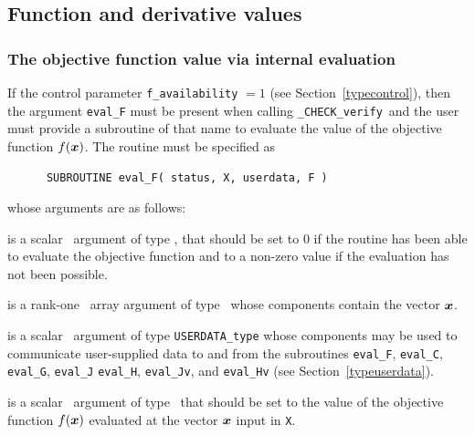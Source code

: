 \documentclass{galahad}
\newcommand{\packagename}{CHECK}
\newcommand{\fullpackagename}{\libraryname\_\packagename}
\newcommand{\solver}{{\tt \fullpackagename\_verify}}
\begin{document}

\subsection{Function and derivative values\label{fdv}}


\subsubsection{The objective function value via internal evaluation\label{ffv}}

If the control parameter {\tt f\_availability} $=1$ (see
Section~\ref{typecontrol}), then the argument
{\tt eval\_F} must be present when calling \solver\ and the
user must provide a subroutine of that name to evaluate the
value of the objective function $f({\bm{x}})$.
The routine must be specified as

\def\baselinestretch{0.8}
{\tt \begin{verbatim}
      SUBROUTINE eval_F( status, X, userdata, F ) \end{verbatim} }
\def\baselinestretch{1.0}
\noindent whose arguments are as follows:

\begin{description}
 is a scalar \intentout\ argument of type \integer,
that should be set to 0 if the routine has been able to evaluate 
the objective function
and to a non-zero value if the evaluation has not been possible.

 is a rank-one \intentin\ array argument of type \realdp\
whose components contain the vector ${\bm{x}}$.

 is a scalar \intentinout\ argument of type 
{\tt USERDATA\_type} whose components may be used
to communicate user-supplied data to and from the
subroutines {\tt eval\_F}, {\tt eval\_C}, {\tt eval\_G}, {\tt eval\_J}
{\tt eval\_H}, {\tt eval\_Jv}, and {\tt eval\_Hv} 
(see Section~\ref{typeuserdata}). 

 is a scalar \intentout\ argument of type \realdp\
that should be set to the value of the objective function $f({\bm{x}})$
evaluated at the vector ${\bm{x}}$ input in {\tt X}.

\end{description}

\end{document}
